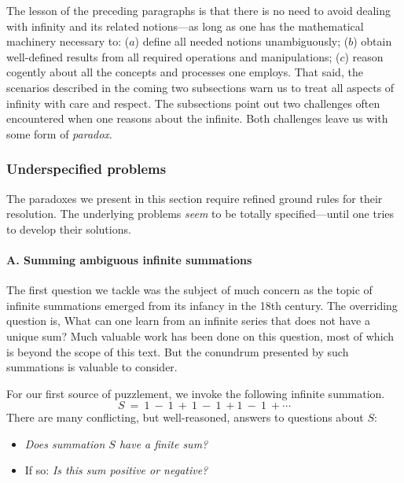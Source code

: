 \smallskip

The lesson of the preceding paragraphs is that there is no need to avoid dealing with infinity and its related notions---as long as one has the mathematical machinery necessary to: ($a$) define all needed notions unambiguously; ($b$) obtain well-defined results from all required operations and manipulations; ($c$) reason cogently about all the concepts and processes one employs.  That said, the scenarios described in the coming two subsections warn us to treat all aspects of infinity with care and respect.  The subsections point out two challenges often encountered when one reasons about the infinite.  Both challenges leave us with some form of {\em paradox}.

\subsubsection{Underspecified problems}
\label{sec:underspecified}

The paradoxes we present in this section require refined ground rules for their resolution.  
The underlying problems {\em seem} to be totally specified---until one tries to develop their solutions.

\paragraph{A. Summing ambiguous infinite summations}

The first question we tackle was the subject of much concern as the topic of infinite summations emerged from its infancy in the 18th century.  The overriding question is, What can one learn from an infinite series that does not have a unique sum?  Much valuable work has been done on this question, most of which is beyond the scope of this text.  But the conundrum presented by 
such summations is valuable to consider.

\medskip

For our first source of puzzlement, we invoke the following infinite summation.
\[ S \ = \ 1 \ - \ 1 \ + \ 1 \ - \ 1 \ + 1 \ - \ 1 \ + \cdots \]
There are many conflicting, but well-reasoned, answers to questions about $S$:
\begin{itemize}
\item
{\it Does summation $S$ have a finite sum?} 
\medskip\item
If so: {\it Is this sum positive or negative?}
\end{itemize}

